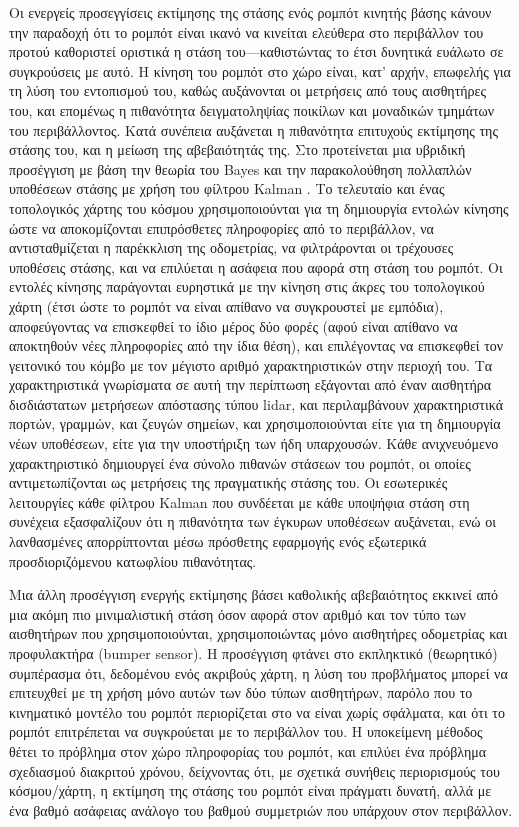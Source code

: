 Οι ενεργείς προσεγγίσεις εκτίμησης της στάσης ενός ρομπότ κινητής βάσης κάνουν
την παραδοχή ότι το ρομπότ είναι ικανό να κινείται ελεύθερα στο περιβάλλον του
προτού καθοριστεί οριστικά η στάση του---καθιστώντας το έτσι δυνητικά ευάλωτο
σε συγκρούσεις με αυτό. Η κίνηση του ρομπότ στο χώρο είναι, κατ' αρχήν,
επωφελής για τη λύση του εντοπισμού του, καθώς αυξάνονται οι μετρήσεις από
τους αισθητήρες του, και επομένως η πιθανότητα δειγματοληψίας ποικίλων και
μοναδικών τμημάτων του περιβάλλοντος. Κατά συνέπεια αυξάνεται η πιθανότητα
επιτυχούς εκτίμησης της στάσης του, και η μείωση της αβεβαιότητάς της. Στο
\cite{Jensfelt2001a} προτείνεται μια υβριδική προσέγγιση με βάση την θεωρία του
Bayes \cite{thrun2005probabilistic} και την παρακολούθηση πολλαπλών υποθέσεων
στάσης με χρήση του φίλτρου Kalman \cite{Maybeck1979}. Το τελευταίο και ένας
τοπολογικός χάρτης του κόσμου χρησιμοποιούνται για τη δημιουργία εντολών
κίνησης ώστε να αποκομίζονται επιπρόσθετες πληροφορίες από το περιβάλλον, να
αντισταθμίζεται η παρέκκλιση της οδομετρίας, να φιλτράρονται οι
τρέχουσες υποθέσεις στάσης, και να επιλύεται η ασάφεια που αφορά στη στάση του
ρομπότ. Οι εντολές κίνησης παράγονται ευρηστικά με την κίνηση στις άκρες του
τοπολογικού χάρτη (έτσι ώστε το ρομπότ να είναι απίθανο να συγκρουστεί με
εμπόδια), αποφεύγοντας να επισκεφθεί το ίδιο μέρος δύο φορές (αφού είναι
απίθανο να αποκτηθούν νέες πληροφορίες από την ίδια θέση), και επιλέγοντας να
επισκεφθεί τον γειτονικό του κόμβο με τον μέγιστο αριθμό χαρακτηριστικών στην
περιοχή του. Τα χαρακτηριστικά γνωρίσματα σε αυτή την περίπτωση εξάγονται από
έναν αισθητήρα δισδιάστατων μετρήσεων απόστασης τύπου lidar, και περιλαμβάνουν
χαρακτηριστικά πορτών, γραμμών, και ζευγών σημείων, και χρησιμοποιούνται είτε
για τη δημιουργία νέων υποθέσεων, είτε για την υποστήριξη των ήδη υπαρχουσών.
Κάθε ανιχνευόμενο χαρακτηριστικό δημιουργεί ένα σύνολο πιθανών στάσεων του
ρομπότ, οι οποίες αντιμετωπίζονται ως μετρήσεις της πραγματικής στάσης του.  Οι
εσωτερικές λειτουργίες κάθε φίλτρου Kalman που συνδέεται με κάθε υποψήφια στάση
στη συνέχεια εξασφαλίζουν ότι η πιθανότητα των έγκυρων υποθέσεων αυξάνεται, ενώ
οι λανθασμένες απορρίπτονται μέσω πρόσθετης εφαρμογής ενός εξωτερικά
προσδιοριζόμενου κατωφλίου πιθανότητας.

Μια άλλη προσέγγιση ενεργής εκτίμησης βάσει καθολικής αβεβαιότητος \cite{OKane}
εκκινεί από μια ακόμη πιο μινιμαλιστική στάση όσον αφορά στον αριθμό και τον
τύπο των αισθητήρων που χρησιμοποιούνται, χρησιμοποιώντας μόνο αισθητήρες
οδομετρίας και προφυλακτήρα (bumper sensor). Η προσέγγιση φτάνει στο εκπληκτικό
(θεωρητικό) συμπέρασμα ότι, δεδομένου ενός ακριβούς χάρτη, η λύση του
προβλήματος μπορεί να επιτευχθεί με τη χρήση μόνο αυτών των δύο τύπων
αισθητήρων, παρόλο που το κινηματικό μοντέλο του ρομπότ περιορίζεται στο να
είναι χωρίς σφάλματα, και ότι το ρομπότ επιτρέπεται να συγκρούεται με το
περιβάλλον του. Η υποκείμενη μέθοδος θέτει το πρόβλημα στον χώρο πληροφορίας
του ρομπότ, και επιλύει ένα πρόβλημα σχεδιασμού διακριτού χρόνου, δείχνοντας
ότι, με σχετικά συνήθεις περιορισμούς του κόσμου/χάρτη, η εκτίμηση της στάσης
του ρομπότ είναι πράγματι δυνατή, αλλά με ένα βαθμό ασάφειας ανάλογο του βαθμού
συμμετριών που υπάρχουν στον περιβάλλον.

